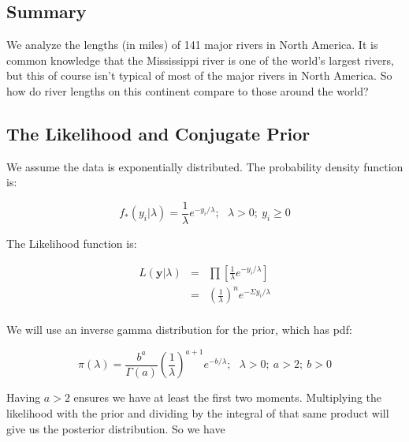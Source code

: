 \documentclass[12pt]{article}
\begin{document}
\subsection{Summary}

\noindent We analyze the lengths (in miles) of 141 major rivers in North America.  It is common knowledge that the Mississippi river is one of the world's largest rivers, but this of course isn't typical of most of the major rivers in North America.  So how do river lengths on this continent compare to those around the world?

\subsection{The Likelihood and Conjugate Prior}

\noindent We assume the data is exponentially distributed.  The probability density function is:

\[f_*(y_i|\lambda)=\frac{1}{\lambda}e^{-y_i/\lambda};\ \ \ \lambda>0;\ y_i\geq 0 \]

\noindent The Likelihood function is:

\begin{eqnarray*}
L(\mathbf{y}|\lambda) &=& \prod\left[\frac{1}{\lambda}e^{-y_i/\lambda}\right] \\
&=& \left(\frac{1}{\lambda}\right)^ne^{-\Sigma y_i/\lambda} \\
\end{eqnarray*}

\noindent We will use an inverse gamma distribution for the prior, which has pdf:

\[\pi(\lambda)=\frac{b^a}{\Gamma(a)}\left(\frac{1}{\lambda}\right)^{a+1}e^{-b/\lambda};\ \ \ \lambda>0;\ a>2;\ b>0\]

\noindent Having $a>2$ ensures we have at least the first two moments. Multiplying the likelihood with the prior and dividing by the integral of that same product will give us the posterior distribution.  So we have
\end{document}

